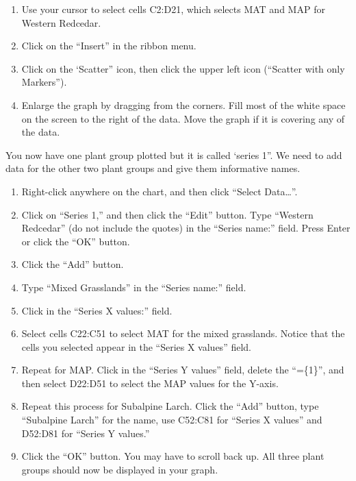 \documentclass[12pt, hidelinks]{exam}
\begin{document}
\begin{enumerate}
	\item Use your cursor to select cells C2:D21, which selects MAT and MAP for Western Redcedar.

	\item Click on the “Insert” in the ribbon menu.

	\item Click on the ‘Scatter” icon, then click the upper left icon (“Scatter with only Markers”).

	\item Enlarge the graph by dragging from the corners. Fill most of the white space on the screen to the right of the data. Move the graph if it is covering any of the data. 
\end{enumerate}

You now have one plant group plotted but it is called ‘series 1”. We need to add data for the other two plant groups and give them informative names. 

\begin{enumerate}[resume]
	\item Right-click anywhere on the chart, and then click “Select Data\dots”.

	\item Click on “Series 1,” and then click the “Edit” button. Type “Western Redcedar” (do not include the quotes) in the “Series name:” field. Press Enter or click the “OK” button.

	\item Click the “Add” button.

	\item Type “Mixed Grasslands” in the “Series name:” field.

	\item Click in the “Series X values:” field.

	\item Select cells C22:C51 to select MAT for the mixed grasslands. Notice that the cells you selected appear in the “Series X values” field.

	\item Repeat for MAP. Click in the “Series Y values” field, delete the “=\{1\}”, and then select D22:D51 to select the MAP values for the Y-axis. 

	\item Repeat this process for Subalpine Larch. Click the “Add” button, type “Subalpine Larch” for the name, use C52:C81 for “Series X values” and D52:D81 for “Series Y values.” 

	\item Click the “OK” button. You may have to scroll back up. All three plant groups should now be displayed in your graph. 
\end{enumerate}
\end{document}
